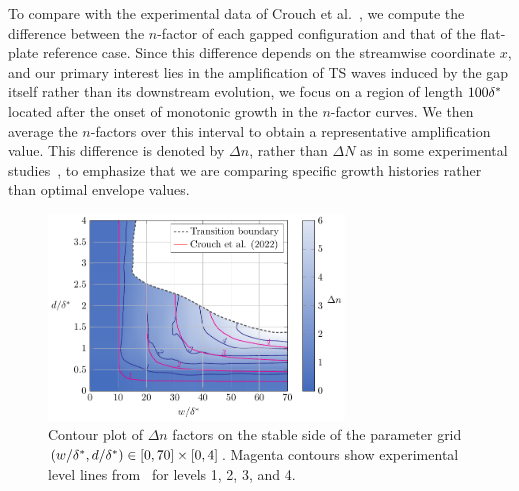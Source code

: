 \documentclass[../main.tex]{subfiles}
\begin{document}

To compare with the experimental data of Crouch et al.~\cite{jeffGaps}, we compute the difference between the $n$-factor of each gapped configuration and that of the flat-plate reference case. Since this difference depends on the streamwise coordinate $x$, and our primary interest lies in the amplification of TS waves induced by the gap itself rather than its downstream evolution, we focus on a region of length $100{\delta^*}$ located after the onset of monotonic growth in the $n$-factor curves. We then average the $n$-factors over this interval to obtain a representative amplification value. This difference is denoted by $\Delta n$, rather than $\Delta N$ as in some experimental studies~\cite{jeffGaps,jeffConference}, to emphasize that we are comparing specific growth histories rather than optimal envelope values.

\begin{figure}[ht]
	\centering
	\includegraphics[width=0.7\textwidth]{../../Images/nfactor_countour.pdf}
	\caption{Contour plot of $\Delta n$ factors on the stable side of the parameter grid $(w/{\delta^*},d/{\delta^*})\in[0,70]\times[0,4]$. Magenta contours show experimental level lines from~\cite{jeffGaps} for levels 1, 2, 3, and 4.}
	\label{fig:nfactorcountour}
\end{figure}
\end{document}
